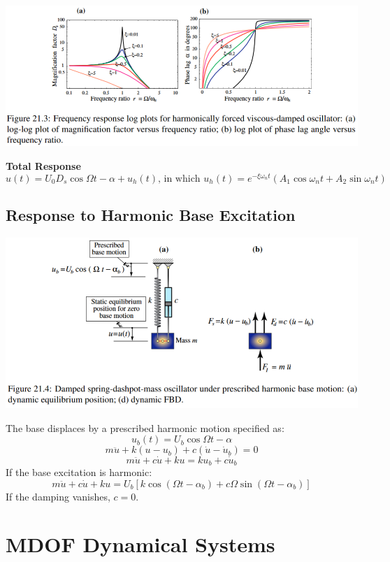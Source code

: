 \documentclass{article}
\begin{document}
\begin{multicols*}{2}
    \includegraphics[width=\linewidth]{Figures/freq_response_harmonic_osc.png}

    \textbf{Total Response}
    $$\boxed{u(t)=U_0D_s\cos{\Omega t-\alpha}+u_h(t) \text{, in which } u_h(t) = e^{-\xi \omega_n t}\left(A_1\cos{\omega_nt}+A_2\sin{\omega_nt}\right)}$$

    \subsection*{Response to Harmonic Base Excitation}
    \includegraphics[width=\linewidth]{Figures/harmonic_base.png}\par 
    The base displaces by a prescribed harmonic motion specified as:
    $$u_b(t) = U_b\cos{\Omega t-\alpha}$$
    $$m\ddot{u}+k(u-u_b)+c(\dot{u}-\dot{u}_b)=0$$
    $$\boxed{m\ddot{u}+c\dot{u}+ku=ku_b+c\dot{u}_b}$$
    If the base excitation is harmonic:
    $$\boxed{m\ddot{u}+c\dot{u}+ku=U_b\left[k\cos{(\Omega t-\alpha_b)}+c\Omega\sin{(\Omega t-\alpha_b)}\right]}$$
    If the damping vanishes, $c=0$.

    \section*{MDOF Dynamical Systems}
    


\end{multicols*}  
\end{document}
